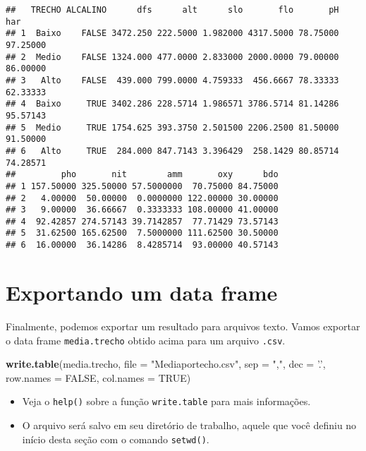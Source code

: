 \documentclass[
]{book}
\newenvironment{Shaded}{\begin{snugshade}}{\end{snugshade}}
\newcommand{\DataTypeTok}[1]{\textcolor[rgb]{0.13,0.29,0.53}{#1}}
\newcommand{\KeywordTok}[1]{\textcolor[rgb]{0.13,0.29,0.53}{\textbf{#1}}}
\newcommand{\NormalTok}[1]{#1}
\newcommand{\OtherTok}[1]{\textcolor[rgb]{0.56,0.35,0.01}{#1}}
\newcommand{\StringTok}[1]{\textcolor[rgb]{0.31,0.60,0.02}{#1}}
\providecommand{\tightlist}{%
  \setlength{\itemsep}{0pt}\setlength{\parskip}{0pt}}
\begin{document}
\begin{verbatim}
##   TRECHO ALCALINO      dfs      alt      slo       flo       pH      har
## 1  Baixo    FALSE 3472.250 222.5000 1.982000 4317.5000 78.75000 97.25000
## 2  Medio    FALSE 1324.000 477.0000 2.833000 2000.0000 79.00000 86.00000
## 3   Alto    FALSE  439.000 799.0000 4.759333  456.6667 78.33333 62.33333
## 4  Baixo     TRUE 3402.286 228.5714 1.986571 3786.5714 81.14286 95.57143
## 5  Medio     TRUE 1754.625 393.3750 2.501500 2206.2500 81.50000 91.50000
## 6   Alto     TRUE  284.000 847.7143 3.396429  258.1429 80.85714 74.28571
##         pho       nit        amm       oxy      bdo
## 1 157.50000 325.50000 57.5000000  70.75000 84.75000
## 2   4.00000  50.00000  0.0000000 122.00000 30.00000
## 3   9.00000  36.66667  0.3333333 108.00000 41.00000
## 4  92.42857 274.57143 39.7142857  77.71429 73.57143
## 5  31.62500 165.62500  7.5000000 111.62500 30.50000
## 6  16.00000  36.14286  8.4285714  93.00000 40.57143
\end{verbatim}

\hypertarget{exportando-um-data-frame}{%
\section{Exportando um data frame}\label{exportando-um-data-frame}}

Finalmente, podemos exportar um resultado para arquivos texto. Vamos exportar o data frame \texttt{media.trecho} obtido acima para um arquivo \texttt{.csv}.

\begin{Shaded}
\begin{Highlighting}[]
\KeywordTok{write.table}\NormalTok{(media.trecho, }\DataTypeTok{file =} \StringTok{"Mediaportecho.csv"}\NormalTok{, }
            \DataTypeTok{sep =} \StringTok{","}\NormalTok{, }\DataTypeTok{dec =} \StringTok{'.'}\NormalTok{, }\DataTypeTok{row.names =} \OtherTok{FALSE}\NormalTok{, }
            \DataTypeTok{col.names =} \OtherTok{TRUE}\NormalTok{)}
\end{Highlighting}
\end{Shaded}

\begin{itemize}
\tightlist
\item
  Veja o \texttt{help()} sobre a função \texttt{write.table} para mais informações.
\item
  O arquivo será salvo em seu diretório de trabalho, aquele que você definiu no início desta seção com o comando \texttt{setwd()}.
\end{itemize}
\end{document}
